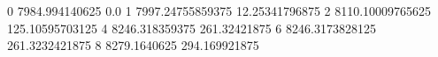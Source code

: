 0 7984.994140625 0.0
1 7997.24755859375 12.25341796875
2 8110.10009765625 125.10595703125
4 8246.318359375 261.32421875
6 8246.3173828125 261.3232421875
8 8279.1640625 294.169921875
